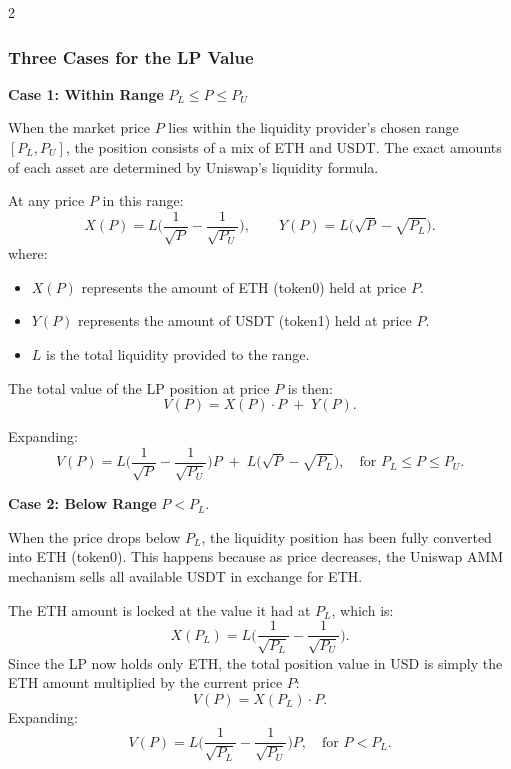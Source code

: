 \documentclass[12pt]{article}
\begin{document}
\begin{multicols}{2}
\subsubsection{Three Cases for the LP Value}

\textbf{Case 1: Within Range} $P_L \le P \le P_U$ 

\medskip

When the market price $P$ lies within the liquidity provider's chosen range $[P_L, P_U]$, the position consists of a mix of ETH and USDT. The exact amounts of each asset are determined by Uniswap's liquidity formula.

\medskip

At any price $P$ in this range:
\[
X(P) = L \biggl(\frac{1}{\sqrt{P}} - \frac{1}{\sqrt{P_U}}\biggr),
\qquad
Y(P) = L \bigl(\sqrt{P} - \sqrt{P_L}\bigr).
\]
where:
\begin{itemize}
	\item $X(P)$ represents the amount of ETH (token0) held at price $P$.
	\item $Y(P)$ represents the amount of USDT (token1) held at price $P$.
	\item $L$ is the total liquidity provided to the range.
\end{itemize}

The total value of the LP position at price $P$ is then:
\[
V(P) = X(P) \cdot P \;+\; Y(P).
\]

Expanding:
\[
V(P) = L \biggl(\frac{1}{\sqrt{P}} - \frac{1}{\sqrt{P_U}}\biggr) P
\;+\;
L \bigl(\sqrt{P} - \sqrt{P_L}\bigr),
\quad \text{for } P_L \le P \le P_U.
\]

\medskip

\textbf{Case 2: Below Range} $P < P_L$.

\medskip

When the price drops below $P_L$, the liquidity position has been fully converted into ETH (token0). This happens because as price decreases, the Uniswap AMM mechanism sells all available USDT in exchange for ETH.

\medskip

The ETH amount is locked at the value it had at $P_L$, which is:
\[
X(P_L) = L \biggl(\frac{1}{\sqrt{P_L}} - \frac{1}{\sqrt{P_U}}\biggr).
\]
Since the LP now holds only ETH, the total position value in USD is simply the ETH amount multiplied by the current price $P$:
\[
V(P) = X(P_L) \cdot P.
\]
Expanding:
\[
V(P) = L \biggl(\frac{1}{\sqrt{P_L}} - \frac{1}{\sqrt{P_U}}\biggr) P,
\quad \text{for } P < P_L.
\]


\end{multicols}
\end{document}
